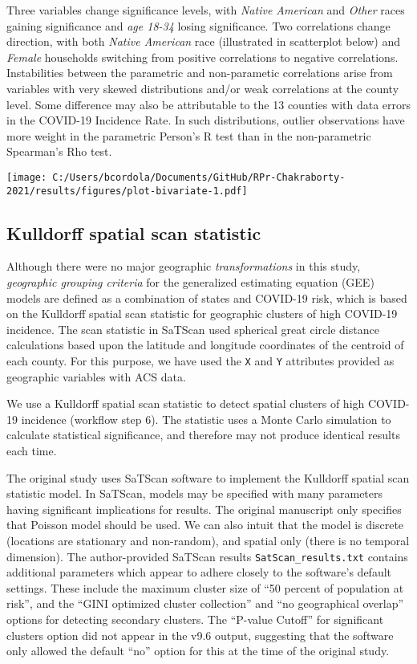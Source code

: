 \documentclass[
]{article}
\begin{document}
Three variables change significance levels, with \emph{Native American}
and \emph{Other} races gaining significance and \emph{age 18-34} losing
significance. Two correlations change direction, with both \emph{Native
American} race (illustrated in scatterplot below) and \emph{Female}
households switching from positive correlations to negative
correlations. Instabilities between the parametric and non-parametic
correlations arise from variables with very skewed distributions and/or
weak correlations at the county level. Some difference may also be
attributable to the 13 counties with data errors in the COVID-19
Incidence Rate. In such distributions, outlier observations have more
weight in the parametric Person's R test than in the non-parametric
Spearman's Rho test.

\texttt{[image: C:/Users/bcordola/Documents/GitHub/RPr-Chakraborty-2021/results/figures/plot-bivariate-1.pdf]}

\hypertarget{kulldorff-spatial-scan-statistic}{%
\subsection{Kulldorff spatial scan
statistic}\label{kulldorff-spatial-scan-statistic}}

Although there were no major geographic \emph{transformations} in this
study, \emph{geographic grouping criteria} for the generalized
estimating equation (GEE) models are defined as a combination of states
and COVID-19 risk, which is based on the Kulldorff spatial scan
statistic for geographic clusters of high COVID-19 incidence. The scan
statistic in SaTScan used spherical great circle distance calculations
based upon the latitude and longitude coordinates of the centroid of
each county. For this purpose, we have used the \texttt{X} and
\texttt{Y} attributes provided as geographic variables with ACS data.

We use a Kulldorff spatial scan statistic to detect spatial clusters of
high COVID-19 incidence (workflow step 6). The statistic uses a Monte
Carlo simulation to calculate statistical significance, and therefore
may not produce identical results each time.

The original study uses SaTScan software to implement the Kulldorff
spatial scan statistic model. In SaTScan, models may be specified with
many parameters having significant implications for results. The
original manuscript only specifies that Poisson model should be used. We
can also intuit that the model is discrete (locations are stationary and
non-random), and spatial only (there is no temporal dimension). The
author-provided SaTScan results \texttt{SatScan\_results.txt} contains
additional parameters which appear to adhere closely to the software's
default settings. These include the maximum cluster size of ``50 percent
of population at risk'', and the ``GINI optimized cluster collection''
and ``no geographical overlap'' options for detecting secondary
clusters. The ``P-value Cutoff'' for significant clusters option did not
appear in the v9.6 output, suggesting that the software only allowed the
default ``no'' option for this at the time of the original study.
\end{document}
